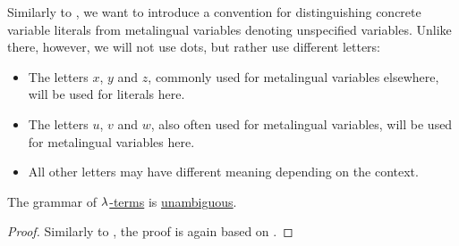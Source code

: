 \begin{remark}\label{rem:lambda_object_language}
  Similarly to , we want to introduce a convention for distinguishing concrete variable literals from metalingual variables denoting unspecified variables. Unlike there, however, we will not use dots, but rather use different letters:
  \begin{itemize}
    \item The letters \( x \), \( y \) and \( z \), commonly used for metalingual variables elsewhere, will be used for literals here.
    \item The letters \( u \), \( v \) and \( w \), also often used for metalingual variables, will be used for metalingual variables here.
    \item All other letters may have different meaning depending on the context.
  \end{itemize}
\end{remark}

\begin{proposition}\label{thm:lambda_terms_are_unambiguous}
  The grammar of \hyperref[def:untyped_lambda_term]{\( \mathrm{\lambda} \)-terms} is \hyperref[def:grammar_ambiguity]{unambiguous}.
\end{proposition}
\begin{proof}
  Similarly to , the proof is again based on .
\end{proof}

